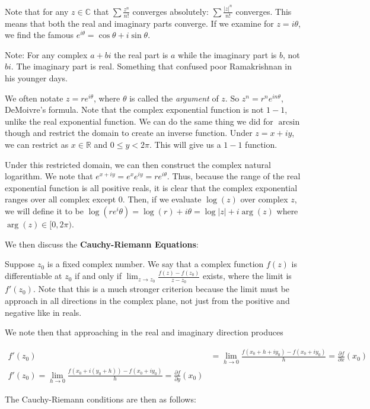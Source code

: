 \documentclass{report}
\begin{document}
Note that for any $z \in\mathbb{C}$ that $\sum{\frac{z^n}{n!}}$ converges absolutely: $\sum{\frac{|z|^n}{n!}}$ converges. This means that both the real and imaginary parts converge. If we examine for $z = i\theta$, we find the famous $e^{i\theta} = \cos \theta + i \sin \theta$.

Note: For any complex $a + bi$ the real part is $a$ while the imaginary part is $b$, not $bi$. The imaginary part is real. Something that confused poor Ramakrishnan in his younger days.

We often notate $z = re^{i\theta}$, where $\theta$ is called the \emph{argument} of $z$. So $z^n = r^ne^{in\theta}$, DeMoivre's formula. Note that the complex exponential function is not $1-1$, unlike the real exponential function. We can do the same thing we did for $\arcsin$ though and restrict the domain to create an inverse function. Under $z = x + iy$, we can restrict as $x \in \mathbb{R}$ and $0 \leq y < 2\pi$. This will give us a $1-1$ function.

Under this restricted domain, we can then construct the complex natural logarithm. We note that $e^{x + iy} = e^xe^{iy} = re^{i\theta}$. Thus, because the range of the real exponential function is all positive reals, it is clear that the complex exponential ranges over all complex except $0$. Then, if we evaluate $\log(z)$ over complex $z$, we will define it to be $\log(re^i\theta) = \log(r) + i\theta = \log|z| + i\arg(z)$ where $\arg(z) \in [0,2\pi)$. 

We then discuss the \textbf{Cauchy-Riemann Equations}: 

Suppose $z_0$ is a fixed complex number. We say that a complex function $f(z)$ is differentiable at $z_0$ if and only if $\lim_{z\to z_0} \frac{f(z) - f(z_0)}{z - z_0}$ exists, where the limit is $f'(z_0)$. Note that this is a much stronger criterion because the limit must be approach in all directions in the complex plane, not just from the positive and negative like in reals.

We note then that approaching in the real and imaginary direction produces 

\begin{align*}
f'(z_0) &= \lim_{h \to 0}\frac{f(x_0+h + iy_0) - f(x_0 + iy_0)}{h} = \frac{\partial f}{\partial x}(x_0)\\
f'(z_0) = \lim_{h \to 0}\frac{f(x_0 + i(y_0+h)) - f(x_0 + iy_0)}{h} = \frac{\partial f}{\partial y}(x_0)
\end{align*}

The Cauchy-Riemann conditions are then as follows:
\end{document}
